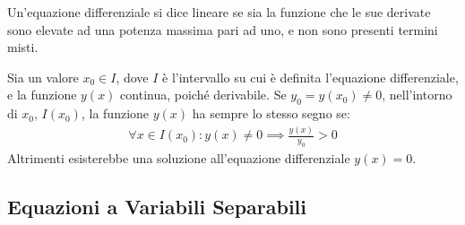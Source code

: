 \documentclass{article}
\numberwithin{equation}{subsection}
\begin{document}
Un'equazione differenziale si dice lineare se sia la funzione che le sue derivate sono elevate ad una potenza massima pari ad uno, e non sono presenti termini misti. 


Sia un valore $x_0\in I$, dove $I$ è l'intervallo su cui è definita l'equazione differenziale, e la funzione $y(x)$ continua, poiché derivabile. Se $y_0=y(x_0)\neq0$, nell'intorno di $x_0$, $I(x_0)$, la funzione $y(x)$ ha sempre lo stesso segno se:
\begin{gather*}
    \forall x\in I(x_0):y(x)\neq0\implies \displaystyle\frac{y(x)}{y_0}>0
\end{gather*}
Altrimenti esisterebbe una soluzione all'equazione differenziale $y(x)=0$. 

\subsection{Equazioni a Variabili Separabili}
\end{document}
